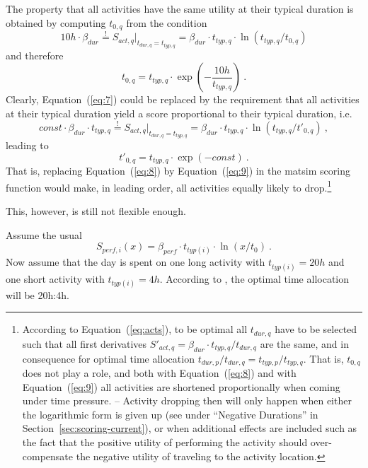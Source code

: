 The property that all activities have the same utility at their typical duration is obtained by computing $t_{0,q}$ from the condition
\begin{equation}
10h \cdot \beta_{dur} \stackrel!= S_{act,q} \Big|_{t_{dur,q} = t_{typ,q}}
=
\beta_{dur} \cdot t_{typ,q} \cdot \ln(t_{typ,q}/t_{0,q}) 
\label{eq:7}
\end{equation}
and therefore
\begin{equation}
t_{0,q} = t_{typ,q} \cdot \exp\left( - \frac{10h}{t_{typ,q}} \right) \ .
\label{eq:8}
\end{equation}
Clearly, Equation~(\ref{eq:7}) could be replaced by the requirement that all activities at their typical duration yield a score proportional to their typical duration, i.e.\
\[
const \cdot \beta_{dur} \cdot t_{typ,q} \stackrel!= S_{act,q} \Big|_{t_{dur,q} = t_{typ,q}}
=
\beta_{dur} \cdot t_{typ,q} \cdot \ln(t_{typ,q}/t'_{0,q}) \ , 
\]
leading to
\begin{equation}
t'_{0,q} = t_{typ,q} \cdot \exp( - const ) \ .
\label{eq:9}
\end{equation}
That is, replacing Equation~(\ref{eq:8}) by Equation~(\ref{eq:9}) in the \gls{matsim} scoring function would make, in leading order, all activities equally likely to drop.\footnote{%
%
According to Equation~(\ref{eq:acts}), to be optimal all $t_{dur,q}$ have to be selected such that all first derivatives $S'_{act,q} = \beta_{dur} \cdot t_{typ,q} / t_{dur,q}$ are the same, and in consequence for optimal time allocation $t_{dur,p}/t_{dur,q} = t_{typ,p}/t_{typ,q}$.  That is, $t_{0,q}$ does not play a role, and both with Equation~(\ref{eq:8}) and with Equation~(\ref{eq:9}) all activities are shortened proportionally when coming under time pressure. -- Activity dropping then will only happen when either the logarithmic form is given up (see under ``Negative Durations'' in Section~\ref{sec:scoring-current}), or when additional effects are included such as the fact that the positive utility of performing the activity should over-compensate the negative utility of traveling to the activity location.
%
}

This, however, is still not flexible enough.  


Assume the usual  
\[
S_{perf,i}(x) = \beta_{perf} \cdot t_{typ(i)} \cdot \ln(x/t_0) \ .
\]
Now assume that the day is spent on one long activity with $t_{typ(i)} = 20h$ and one short activity with $t_{typ(i)} = 4h$.  According to , the optimal time allocation will be 20h:4h.

